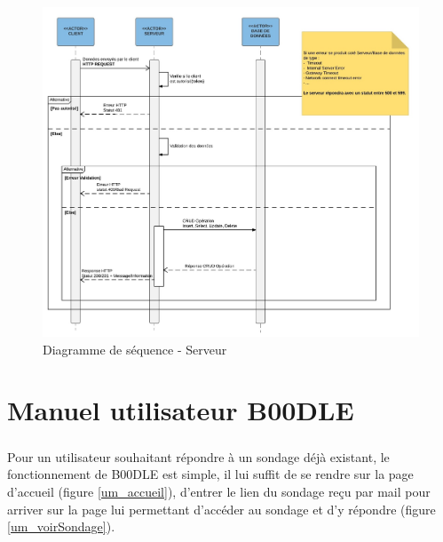\documentclass[titlepage]{report}
\begin{document}
\begin{figure}[h]
	\caption{Diagramme de séquence - Serveur}
	\label{diagramme_sequence_serveur}
	\centering
	\includegraphics[width=\textwidth]{figures/diagrammes/sequence_serveur.png}
\end{figure}

\clearpage

\chapter{Manuel utilisateur B00DLE}

\paragraph{} Pour un utilisateur souhaitant répondre à un sondage déjà existant, le fonctionnement de B00DLE est simple, il lui suffit de se rendre sur la page d'accueil (figure \ref{um_accueil}), d'entrer le lien du sondage reçu par mail pour arriver sur la page lui permettant d'accéder au sondage et d'y répondre (figure \ref{um_voirSondage}).
\end{document}
